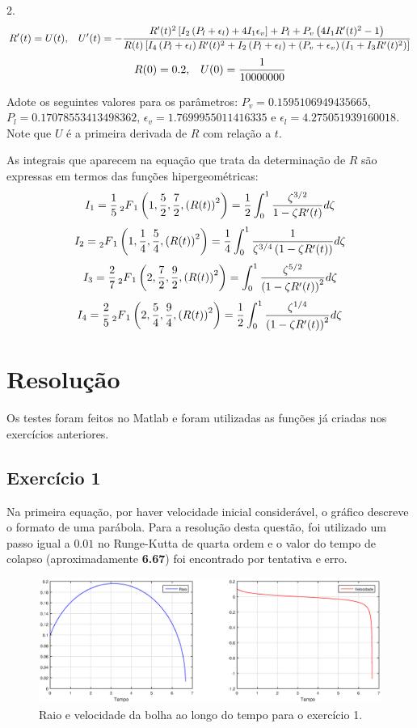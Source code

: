 \documentclass[10pt,a4paper]{article}
\newcommand{\prt}[1]{\left(#1\right)}
\newcommand{\col}[1]{\left[#1\right]}
\newcommand{\hgf}[4]{\prescript{}{2}{F}_1\left(#1,#2,#3,#4\right)}
\begin{document}
	2. \[R'(t)=U(t), \hspace{0.3cm} U'(t)=-\frac{R'(t)^2\col{I_2\prt{P_l+\epsilon_l} + 4I_1\epsilon_v}+P_l+P_v\prt{4I_1R'(t)^2-1}}{R(t)\col{I_4\prt{P_l+\epsilon_l}R'(t)^2+I_2\prt{P_l+\epsilon_l}+\prt{P_v+\epsilon_v}\prt{I_1+I_3R'(t)^2}}}\]
	\[R(0)=0.2, \hspace{.3cm} U(0)=\frac{1}{10000000}\]
	
	Adote os seguintes valores para os parâmetros: $P_v=0.1595106949435665$, $P_l=0.17078553413498362$, $\epsilon_v=1.7699955011416335$ e $\epsilon_l=4.275051939160018$. Note que $U$ é a primeira derivada de $R$ com relação a $t$.
	
	As integrais que aparecem na equação que trata da determinação de $R$ são expressas em termos das funções hipergeométricas:
	\[I_1=\frac{1}{5} \hgf{1}{\frac{5}{2}}{\frac{7}{2}}{\prt{R(t)}^2} = \frac{1}{2}\int_0^1{\frac{\zeta^{3/2}}{1-\zeta R'(t)}d\zeta}\]
	\[I_2=\hgf{1}{\frac{1}{4}}{\frac{5}{4}}{\prt{R(t)}^2} = \frac{1}{4}\int_0^1{\frac{1}{\zeta^{3/4}\prt{1-\zeta R'(t)}}d\zeta}\]
	\[I_3=\frac{2}{7}\hgf{2}{\frac{7}{2}}{\frac{9}{2}}{\prt{R(t)}^2} = \int_0^1{\frac{\zeta^{5/2}}{\prt{1-\zeta R'(t)}^2}d\zeta}\]
	\[I_4=\frac{2}{5}\hgf{2}{\frac{5}{4}}{\frac{9}{4}}{\prt{R(t)}^2} = \frac{1}{2}\int_0^1{\frac{\zeta^{1/4}}{\prt{1-\zeta R'(t)}^2}d\zeta}\]
	
	\newpage
	\section{Resolução}
	Os testes foram feitos no Matlab e foram utilizadas as funções já criadas nos exercícios anteriores.
	\subsection{Exercício 1}
	Na primeira equação, por haver velocidade inicial considerável, o gráfico descreve o formato de uma parábola. Para a resolução desta questão, foi utilizado um passo igual a $0.01$ no Runge-Kutta de quarta ordem e o valor do tempo de colapso (aproximadamente \textbf{6.67}) foi encontrado por tentativa e erro.
	
	\begin{figure}[h!]
    \centering
      \includegraphics[width=1\linewidth]{figures/eq1-h0-01-t-6-67.eps}
      \caption{Raio e velocidade da bolha ao longo do tempo para o exercício 1.}
      \label{fig:raio1}
	\end{figure}
	
\end{document}
